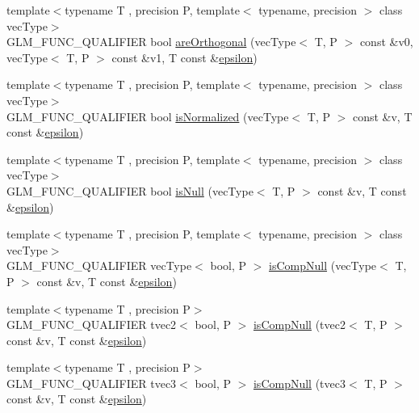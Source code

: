 \begin{DoxyCompactItemize}
\item 
{\footnotesize template$<$typename T , precision P, template$<$ typename, precision $>$ class vec\+Type$>$ }\\G\+L\+M\+\_\+\+F\+U\+N\+C\+\_\+\+Q\+U\+A\+L\+I\+F\+I\+E\+R bool \hyperlink{group__gtx__vector__query_gaee10acefed397c11e01f2862e837754c}{are\+Orthogonal} (vec\+Type$<$ T, P $>$ const \&v0, vec\+Type$<$ T, P $>$ const \&v1, T const \&\hyperlink{group__gtc__constants_ga2a1e57fc5592b69cfae84174cbfc9429}{epsilon})
\item 
{\footnotesize template$<$typename T , precision P, template$<$ typename, precision $>$ class vec\+Type$>$ }\\G\+L\+M\+\_\+\+F\+U\+N\+C\+\_\+\+Q\+U\+A\+L\+I\+F\+I\+E\+R bool \hyperlink{group__gtx__vector__query_ga6fa5fa2af67d14c205d24c49aad03270}{is\+Normalized} (vec\+Type$<$ T, P $>$ const \&v, T const \&\hyperlink{group__gtc__constants_ga2a1e57fc5592b69cfae84174cbfc9429}{epsilon})
\item 
{\footnotesize template$<$typename T , precision P, template$<$ typename, precision $>$ class vec\+Type$>$ }\\G\+L\+M\+\_\+\+F\+U\+N\+C\+\_\+\+Q\+U\+A\+L\+I\+F\+I\+E\+R bool \hyperlink{group__gtx__vector__query_ga81a64edc1a2b470b82896592e89c523b}{is\+Null} (vec\+Type$<$ T, P $>$ const \&v, T const \&\hyperlink{group__gtc__constants_ga2a1e57fc5592b69cfae84174cbfc9429}{epsilon})
\item 
{\footnotesize template$<$typename T , precision P, template$<$ typename, precision $>$ class vec\+Type$>$ }\\G\+L\+M\+\_\+\+F\+U\+N\+C\+\_\+\+Q\+U\+A\+L\+I\+F\+I\+E\+R vec\+Type$<$ bool, P $>$ \hyperlink{group__gtx__vector__query_ga93ecd4137480483ce1af0de8bbbf6546}{is\+Comp\+Null} (vec\+Type$<$ T, P $>$ const \&v, T const \&\hyperlink{group__gtc__constants_ga2a1e57fc5592b69cfae84174cbfc9429}{epsilon})
\item 
{\footnotesize template$<$typename T , precision P$>$ }\\G\+L\+M\+\_\+\+F\+U\+N\+C\+\_\+\+Q\+U\+A\+L\+I\+F\+I\+E\+R tvec2$<$ bool, P $>$ \hyperlink{namespaceglm_afc1ffd2beb09bb3c683b3606b2540519}{is\+Comp\+Null} (tvec2$<$ T, P $>$ const \&v, T const \&\hyperlink{group__gtc__constants_ga2a1e57fc5592b69cfae84174cbfc9429}{epsilon})
\item 
{\footnotesize template$<$typename T , precision P$>$ }\\G\+L\+M\+\_\+\+F\+U\+N\+C\+\_\+\+Q\+U\+A\+L\+I\+F\+I\+E\+R tvec3$<$ bool, P $>$ \hyperlink{namespaceglm_a5972ae9ce1c88fcd539f51a218af865f}{is\+Comp\+Null} (tvec3$<$ T, P $>$ const \&v, T const \&\hyperlink{group__gtc__constants_ga2a1e57fc5592b69cfae84174cbfc9429}{epsilon})

\end{DoxyCompactItemize}
